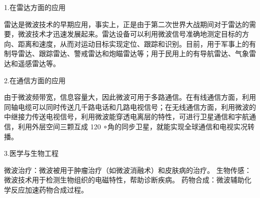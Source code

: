 1.在雷达方面的应用

雷达是微波技术的早期应用，事实上，正是由于第二次世界大战期间对于雷达的需要，微波技术才迅速发展起来。雷达设备可以利用微波信号准确地测定目标的方向、距离和速度，从而对运动目标实现定位、跟踪和识别。目前，用于军事上的有制导雷达、跟踪雷达、警戒雷达和炮瞄雷达等；用于民用上的有导航雷达、气象雷达和遥感雷达等。

2.在通信方面的应用

由于微波频带宽，信息容量大，因此微波可用于多路通信。在有线通信方面，利用同轴电缆可以同时传送几千路电话和几路电视信号；在无线通信方面，利用微波的中继接力传送电视信号，利用微波能穿透电离层的特性，可进行卫星通信和宇航通信，利用外层空间三颗互成 120 ∘角的同步卫星，就能实现全球通信和电视实况转播。

3.医学与生物工程

微波治疗：微波被用于肿瘤治疗（如微波消融术）和皮肤病的治疗。
生物传感：微波技术用于检测生物组织的电磁特性，帮助诊断疾病。
药物合成：微波辅助化学反应加速药物合成过程。



